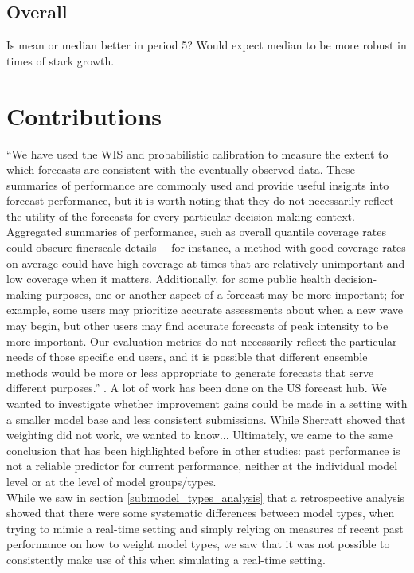 \subsection{Overall}
Is mean or median better in period 5? Would expect median to be more robust in times of stark growth.
\section{Contributions}
``We have used the WIS and probabilistic calibration to measure the extent to which forecasts
are consistent with the eventually observed data. These summaries of performance are commonly
used and provide useful insights into forecast performance, but it is worth noting that they do
not necessarily reflect the utility of the forecasts for every particular decision-making context.
Aggregated summaries of performance, such as overall quantile coverage rates could obscure finerscale
details —for instance, a method with good coverage rates on average could have high coverage
at times that are relatively unimportant and low coverage when it matters. Additionally, for some
public health decision-making purposes, one or another aspect of a forecast may be more important;
for example, some users may prioritize accurate assessments about when a new wave may begin,
but other users may find accurate forecasts of peak intensity to be more important. Our evaluation
metrics do not necessarily reflect the particular needs of those specific end users, and it is possible
that different ensemble methods would be more or less appropriate to generate forecasts that serve
different purposes.'' \citep{ray_comparing_2022}.
A lot of work has been done on the US forecast hub. We wanted to investigate whether improvement gains could be made in a setting with a smaller model base and less consistent submissions. While Sherratt showed that weighting did not work, we wanted to know... Ultimately, we came to the same conclusion that has been highlighted before in other studies: past performance is not a reliable predictor for current performance, neither at the individual model level or at the level of model groups/types. \\
While we saw in section \ref{sub:model_types_analysis} that a retrospective analysis showed that there were some systematic differences between model types, when trying to mimic a real-time setting and simply relying on measures of recent past performance on how to weight model types, we saw that it was not possible to consistently make use of this when simulating a real-time setting.  \\
